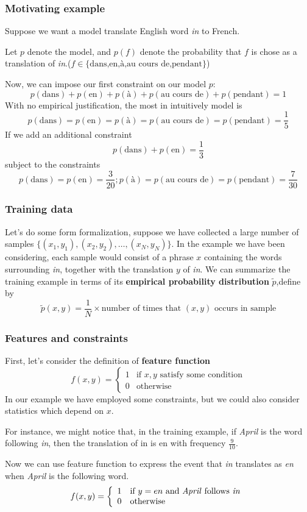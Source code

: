 \documentclass[slidestop,compress,mathserif]{beamer}
\begin{document}
	\begin{frame}[shrink]
		\frametitle{Motivating example}
		Suppose we want a model translate English word \textit{in} to French.
		
		Let $p$ denote the model, and $p(f)$ denote the probability that $f$ is chose as a translation of \textit{in}.($f \in \{\mbox{dans,en,\`{a},au cours de,pendant}\}$)
		
		Now, we can impose our first constraint on our model $p$:
		$$p(\mbox{dans})+p(\mbox{en})+p(\mbox{\`a})+p(\mbox{au cours de})+p(\mbox{pendant}) = 1$$
		With no empirical justification, the most in intuitively model is
		$$p(\mbox{dans})=p(\mbox{en})=p(\mbox{\`a})=p(\mbox{au cours de})=p(\mbox{pendant})=\frac{1}{5}$$
		If we add an additional constraint
		$$p(\mbox{dans})+p(\mbox{en}) = \frac{1}{3}$$
		subject to the constraints
		$$p(\mbox{dans})=p(\mbox{en})=\frac{3}{20};p(\mbox{\`a})=p(\mbox{au cours de})=p(\mbox{pendant})=\frac{7}{30} $$
		
	\end{frame}
	
	\begin{frame}
		\frametitle{Training data}
		Let's do some form formalization, suppose we have collected a large number of samples $\{(x_1,y_1),(x_2,y_2),\ldots,(x_N,y_N)\}$.
		\newline
		\newline
		In the example we have been considering, each sample would consist of a phrase $x$ containing the words surrounding \textit{in}, together with the translation $y$ of \textit{in}.
		\newline
		\newline
		We can summarize the training example in terms of its \textbf{empirical probability distribution} $\widetilde{p}$,define by
		$$\widetilde{p}(x,y) = \frac{1}{N} \times \mbox{number of times that $(x,y)$ occurs in sample}$$
	\end{frame}
	
	\begin{frame}
		\frametitle{Features and constraints}
		First, let's consider the definition of \textbf{feature function}
		$$f(x,y)=\left\{
		\begin{array}{ll}
		1  &\mbox{if $x,y$ satisfy some condition}\\
		0  &\mbox{otherwise}
		\end{array}
		\right.
		$$
		In our example we have employed some constraints, but we could also consider statistics which depend on $x$.
		
		For instance, we might notice that, in the training example, if \textit{April} is the word following \textit{in}, then the translation of in is en with frequency $\frac{9}{10}$.
		
		Now we can use feature function to express the event that \textit{in} translates as \textit{en} when \textit{April} is the following word.
		$$f(x,y)=\left\{
		\begin{array}{ll}
		1  &\mbox{if $y=en$ and \textit{April} follows \textit{in}}\\
		0  &\mbox{otherwise}
		\end{array}
		\right.
		$$
	\end{frame}
	
\end{document}
